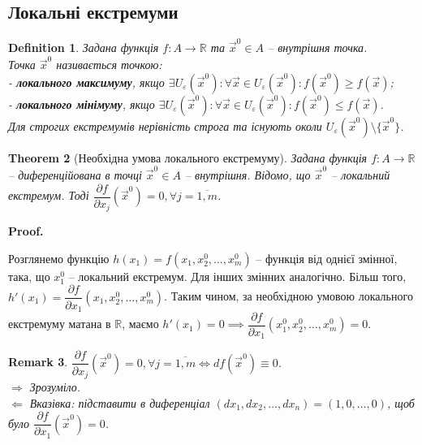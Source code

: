 \documentclass[a4paper, 10pt]{article}
\makeatletter
\def\departial#1#2{\dfrac{\partial {#1}}{\partial {#2}}}
\def\rightproof{$\boxed{\Rightarrow}$ }
\def\leftproof{$\boxed{\Leftarrow}$ }
\theoremstyle{theoremdd}
\newtheorem{theorem}{Theorem}[subsection]
\theoremstyle{theoremdd}
\theoremstyle{theoremdd}
\newtheorem{definition}[theorem]{Definition}
\theoremstyle{theoremdd}
\theoremstyle{theoremdd}
\theoremstyle{theoremdd}
\theoremstyle{theoremdd}
\newtheorem{remark}[theorem]{Remark}
\theoremstyle{theoremdd}
\theoremstyle{theoremdd}
\renewenvironment{proof}[1][Proof.\\]{\par
\pushQED{\hfill \qed}%
\normalfont \topsep6\p@\@plus6\p@\relax
\trivlist
\item\relax
{\bfseries
#1\@addpunct{.}}\hspace\labelsep\ignorespaces
}{%
\popQED\endtrivlist\@endpefalse
}
\makeatother
\begin{document}
\subsection{Локальні екстремуми}
\begin{definition}
Задана функція $f\colon A\to \mathbb{R}$ та $\vec{x}^0 \in A$ -- внутрішня точка.\\
Точка $\vec{x}^0$ називається точкою:\\
- \textbf{локального максимуму}, якщо $\exists U_{\varepsilon}(\vec{x}^0): \forall \vec{x} \in U_{\varepsilon}(\vec{x}^0): f(\vec{x}^0) \geq f(\vec{x})$;\\
- \textbf{локального мінімуму}, якщо $\exists U_{\varepsilon}(\vec{x}^0): \forall \vec{x} \in U_{\varepsilon}(\vec{x}^0): f(\vec{x}^0) \leq f(\vec{x})$.\\
Для строгих екстремумів нерівність строга та існують околи $U_\varepsilon(\vec{x}^0) \setminus \{\vec{x}^0\}$.
\end{definition}

\begin{theorem}[Необхідна умова локального екстремуму]
Задана функція $f\colon A \to \mathbb{R}$ -- диференційована в точці $\vec{x}^0 \in A$ -- внутрішня. Відомо, що $\vec{x}^0$ -- локальний екстремум. Тоді $\departial{f}{x_j}(\vec{x}^0) = 0, \forall j=\overline{1,m}$.
\end{theorem}


\begin{proof}
Розглянемо функцію $h(x_1) = f(x_1,x_2^0,\dots,x_m^0)$ -- функція від однієї змінної, така, що $x_1^0$ -- локальний екстремум. Для інших змінних аналогічно. Більш того, $h'(x_1) = \departial{f}{x_1}(x_1,x_2^0,\dots,x_m^0)$. Таким чином, за необхідною умовою локального екстремуму матана в $\mathbb{R}$, маємо $h'(x_1) = 0 \implies \departial{f}{x_1}(x_1^0,x_2^0,\dots,x_m^0) = 0$.
\end{proof}

\begin{remark}
$\departial{f}{x_j}(\vec{x}^0) = 0, \forall j = \overline{1,m} \iff df(\vec{x}^0) \equiv 0$.\\
\rightproof \textit{Зрозуміло}.\\
\leftproof \textit{Вказівка: підставити в диференціал $(dx_1,dx_2,\dots,dx_n) = (1,0,\dots,0)$, щоб було $\departial{f}{x_1}(\vec{x}^0)=0$}.
\end{remark}
\end{document}
